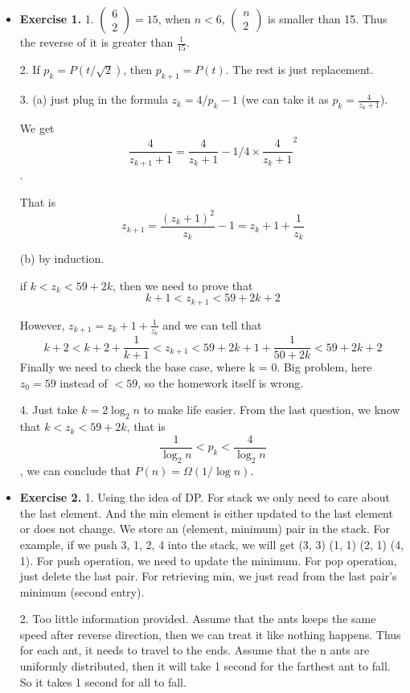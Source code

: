\documentclass{article}
\begin{document}
\noindent

\noindent{}

\begin{itemize}

\item \textbf{Exercise 1.}
1. $\left(\begin{array}{l}6 \\ 2\end{array}\right)=15$, when $n<6$, $\left(\begin{array}{l}n \\ 2\end{array}\right)$ is smaller than 15. Thus the reverse of it is greater than $\frac{1}{15}$.

2. If $p_k = P(t/\sqrt{2})$, then $p_{k+1} = P(t)$. The rest is just replacement.

3. (a) just plug in the formula $z_{k}=4 / p_{k}-1$ (we can take it as $p_k = \frac{4}{z_k + 1}$). 

We get $$\frac{4}{z_{k+1}+1} = \frac{4}{z_{k}+1} - 1/4\times \frac{4}{z_{k}+1}^2$$. 

That is $$z_{k+1} = \frac{(z_k+1)^2}{z_k} - 1 = z_{k}+1+\frac{1}{z_{k}}$$

(b) by induction. 

if $k<z_{k}<59+2 k$, then we need to prove that $$k+1<z_{k+1}<59+2 k + 2$$

However, $z_{k+1} = z_{k}+1+\frac{1}{z_{k}}$ and we can tell that $$k+2<k+2+\frac{1}{k+1}<z_{k+1}<59+2k + 1+ \frac{1}{50+2k}<59 + 2k +2$$
Finally we need to check the base case, where k = 0. Big problem, here $z_0 = 59$ instead of $<59$, so the homework itself is wrong.

4. Just take $k = 2 \log _{2} n$ to make life easier. From the last question, we know that $k<z_{k}<59+2 k$, that is $$\frac{1}{\log _{2} n}<p_{k}<\frac{4}{\log _{2} n}$$, we can conclude that $P(n)=\Omega(1 / \log n)$.


\item \textbf{Exercise 2.}
1. Using the idea of DP. For stack we only need to care about the last element. And the min element is either updated to the last element or does not change. We store an (element, minimum) pair in the stack. For example, if we push 3, 1, 2, 4 into the stack, we will get (3, 3) (1, 1) (2, 1) (4, 1). For push operation, we need to update the minimum. For pop operation, just delete the last pair. For retrieving min, we just read from the last pair's minimum (second entry).

2. Too little information provided. Assume that the ants keeps the same speed after reverse direction, then we can treat it like nothing happens. Thus for each ant, it needs to travel to the ends. Assume that the n ants are uniformly distributed, then it will take 1 second for the farthest ant to fall. So it takes 1 second for all to fall.

\end{itemize}

\end{document}
